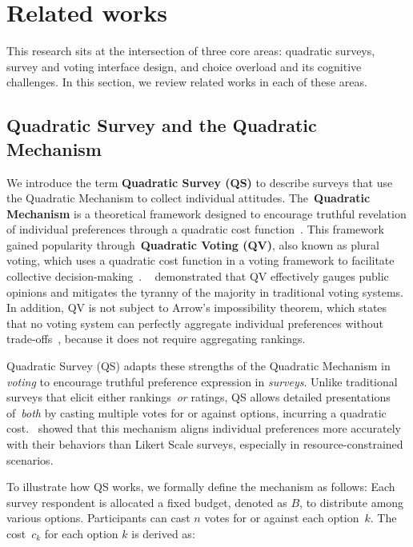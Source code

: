 \section{Related works}
\label{sec:relatedWorks}
This research sits at the intersection of three core areas: quadratic surveys, survey and voting interface design, and choice overload and its cognitive challenges. In this section, we review related works in each of these areas.

\subsection{Quadratic Survey and the Quadratic Mechanism}
We introduce the term \textbf{Quadratic Survey (QS)} to describe surveys that use the Quadratic Mechanism to collect individual attitudes. The~\textbf{Quadratic Mechanism} is a theoretical framework designed to encourage truthful revelation of individual preferences through a quadratic cost function~\cite{grovesOptimalAllocationPublic1977}. This framework gained popularity through~\textbf{Quadratic Voting (QV)}, also known as plural voting, which uses a quadratic cost function in a voting framework to facilitate collective decision-making~\cite{lalley2016quadratic}. ~\textcite{quarfoot2017quadratic} demonstrated that QV effectively gauges public opinions and mitigates the tyranny of the majority in traditional voting systems. In addition, QV is not subject to Arrow's impossibility theorem, which states that no voting system can perfectly aggregate individual preferences without trade-offs~\cite{morreau2014arrow}, because it does not require aggregating rankings.  

Quadratic Survey (QS) adapts these strengths of the Quadratic Mechanism in \textit{voting} to encourage truthful preference expression in \textit{surveys}. Unlike traditional surveys that elicit either rankings~\textit{or} ratings, QS allows detailed presentations of~\textit{both} by casting multiple votes for or against options, incurring a quadratic cost.~\textcite{chengCanShowWhat2021} showed that this mechanism aligns individual preferences more accurately with their behaviors than Likert Scale surveys, especially in resource-constrained scenarios.


To illustrate how QS works, we formally define the mechanism as follows: Each survey respondent is allocated a fixed budget, denoted as $B$, to distribute among various options. Participants can cast $n$ votes for or against each option~$k$. The cost~$c_k$ for each option $k$ is derived as:

